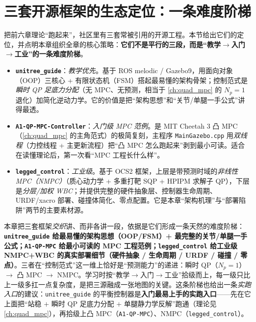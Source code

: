 \section{三套开源框架的生态定位：一条难度阶梯}
\label{sec:qp-ecosystem}

把前六章理论“跑起来”，社区里有三套常被引用的开源工程。本节给出它们的定位，并点明本章组织全章的核心策略：\textbf{它们不是平行的三段，而是“教学$\to$入门$\to$工业”的一条难度阶梯}。

\begin{itemize}
  \item \textbf{\texttt{unitree\_guide}}\cite{unitree2023quadruped}：\emph{教学优先}。基于 ROS melodic / Gazebo9，用面向对象（OOP）三核心 + 有限状态机（FSM）搭起最易懂的架构骨架；控制范式是\emph{瞬时 QP 足底力分配}（无 MPC、无预测，相当于 \cref{ch:quad_mpc} 的 $N_p{=}1$ 退化）加简化逆动力学。它的价值是把“架构思想”和“关节/单腿一手公式”讲得最透。
  \item \textbf{\texttt{A1-QP-MPC-Controller}}\cite{dicarlo2018cheetah}：\emph{入门级 MPC 范例}。是 MIT Cheetah 3 凸 MPC（\cref{ch:quad_mpc} 的主角范式）的极简复刻，主程序 \texttt{MainGazebo.\allowbreak cpp} 用\emph{双线程}（力控线程 + 主更新流程）把“凸 MPC 怎么跑起来”剥到最小可读。适合在读懂理论后，第一次看“MPC 工程长什么样”。
  \item \textbf{\texttt{legged\_control}}\cite{sleiman2021unified}：\emph{工业级}。基于 OCS2 框架，上层是带预测时域的\emph{非线性 MPC（NMPC）}（质心动力学 + 多重打靶 SQP + HPIPM 求解子 QP），下层是\emph{分层/加权 WBC}\cite{bellicoso2016whole}；并提供完整的硬件抽象层、控制器生命周期、URDF/xacro 部署、碰撞体简化、零点配置。它是本章“架构机理”与“部署陷阱”两节的主要素材源。
\end{itemize}

\begin{insight}\label{ins:qp-ladder}
本章把三套框架\emph{交织}讲、而非各讲一段，依据是它们形成一条天然的难度阶梯：\textbf{\texttt{unitree\_guide} 给最易懂的架构思想（OOP/FSM）+ 最完整的关节/单腿一手公式；\texttt{A1-QP-MPC} 给最小可读的 MPC 工程范例；\texttt{legged\_control} 给工业级 NMPC+WBC 的真实部署细节（硬件抽象 / 生命周期 / URDF / 碰撞 / 零点）}。三者在“控制范式”这一维上恰好是“预测能力”的递进：瞬时 QP（$N_p{=}1$）$\to$ 凸 MPC $\to$ NMPC。学习时按“教学$\to$入门$\to$工业”拾级而上，每一级只比上一级多扛一点复杂度，是把三源融成一张地图的关键。这条阶梯也给出一条\emph{实跑入口}的建议：\texttt{unitree\_guide} 的平衡控制器是\textbf{入门最易上手的实跑入口}——先在它上面把“站稳 $+$ 瞬时 QP 足底力分配 $+$ 单腿静力学反解”跑通（理论见 \cref{ch:quad_mpc}），再拾级上凸 MPC（\texttt{A1-QP-MPC}）、NMPC（\texttt{legged\_control}）。
\end{insight}

